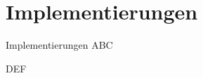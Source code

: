 \section{Implementierungen}

\begin{frame}{Implementierungen}
\cite{samarati1998protecting} ABC

\cite{sweeney2002k} DEF

\end{frame}